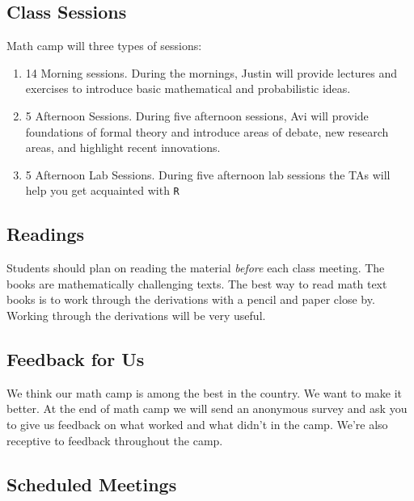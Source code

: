 \documentclass[11pt,letterpaper]{article}
\numberwithin{equation}{section}
\begin{document}
\subsection*{Class Sessions}
Math camp will three types of sessions:

\begin{enumerate}
\item 14 Morning sessions.  During the mornings, Justin will provide lectures and exercises to introduce basic mathematical and probabilistic ideas. 
\item 5 Afternoon Sessions. During five afternoon sessions, Avi will provide foundations of formal theory and introduce areas of debate, new research areas, and highlight recent innovations. 
\item 5 Afternoon Lab Sessions. During five afternoon lab sessions the TAs will help you get acquainted with {\tt R}
\end{enumerate}	



\subsection*{Readings} Students should plan on reading the material \emph{before} each class meeting.  The books are mathematically challenging texts.  The best way to read math text books is to work through the derivations with a pencil and paper close by.  Working through the derivations will be very useful.  %


\subsection*{Feedback for Us} 
We think our math camp is among the best in the country.  We want to make it better.  At the end of math camp we will send an anonymous survey and ask you to give us feedback on what worked and what didn't in the camp.  We're also receptive to feedback throughout the camp.  


\newpage


\subsection*{Scheduled Meetings}
\end{document}
